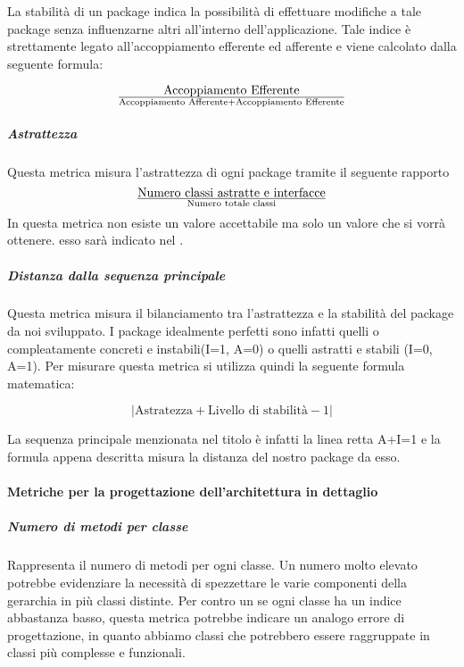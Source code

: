 La stabilità di un package indica la possibilità di effettuare modifiche a tale package senza influenzarne altri all'interno dell'applicazione. Tale indice è strettamente legato all'accoppiamento efferente ed afferente e viene calcolato dalla seguente formula:

\begin{displaymath}
{\text{Accoppiamento Efferente}}\over{\text{Accoppiamento Afferente} + \text{Accoppiamento Efferente}}
\end{displaymath}

\subparagraph{Astrattezza}
Questa metrica misura l'astrattezza di ogni package tramite il seguente rapporto 
\begin{displaymath}
{\text{Numero classi astratte e interfacce}}\over{\text{Numero totale classi}}
\end{displaymath}
In questa metrica non esiste un valore accettabile ma solo un valore che si vorrà ottenere. esso sarà indicato nel \pianodiqualifica.

\subparagraph{Distanza dalla sequenza principale}
Questa metrica misura il bilanciamento tra l'astrattezza e la stabilità del package da noi sviluppato. I package idealmente perfetti sono infatti quelli o compleatamente concreti e instabili(I=1, A=0) o quelli astratti e stabili (I=0, A=1). Per misurare questa metrica si utilizza quindi la seguente formula matematica:

\begin{displaymath}
{|\text{Astratezza} + \text{Livello di stabilità} - 1|}
\end{displaymath}

La sequenza principale menzionata nel titolo è infatti la linea retta A+I=1 e la formula appena descritta misura la distanza del nostro package da esso.

\paragraph{Metriche per la progettazione dell'architettura in dettaglio}

\subparagraph{Numero di metodi per classe}
Rappresenta il numero di metodi per ogni classe.
Un numero molto elevato potrebbe evidenziare la necessità di spezzettare le varie componenti della gerarchia in più classi distinte.
Per contro un se ogni classe ha un indice abbastanza basso, questa metrica potrebbe indicare un analogo errore di progettazione, in quanto abbiamo classi che potrebbero essere raggruppate in classi più complesse e funzionali.

